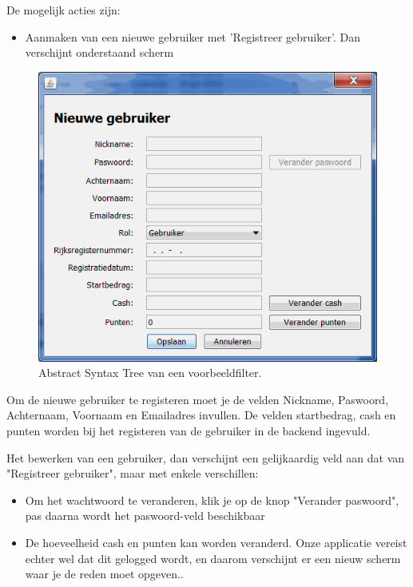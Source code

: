 De mogelijk acties zijn:
\begin{itemize}
\item{Aanmaken van een nieuwe gebruiker met 'Registreer gebruiker'. Dan verschijnt onderstaand scherm}
\end{itemize}

\begin{figure}[h!]
	\centering
		\includegraphics[width=\textwidth]{images/handleiding/handleiding4.gif}
	\caption{Abstract Syntax Tree van een voorbeeldfilter.}
\end{figure}

Om de nieuwe gebruiker te registeren moet je de velden Nickname, Paswoord, Achternaam, Voornaam en Emailadres invullen. 
De velden startbedrag, cash en punten worden bij het registeren van de gebruiker in de backend ingevuld.

Het bewerken van een gebruiker, dan verschijnt een gelijkaardig veld aan dat van "Registreer gebruiker", maar met enkele verschillen:

\begin{itemize}
\item{Om het wachtwoord te veranderen, klik je op de knop "Verander paswoord", pas daarna wordt het paswoord-veld beschikbaar}
\item{De hoeveelheid cash en punten kan worden veranderd. Onze applicatie vereist echter wel dat dit gelogged wordt, en daarom verschijnt er een nieuw scherm waar je de reden moet opgeven..}
\end{itemize}

